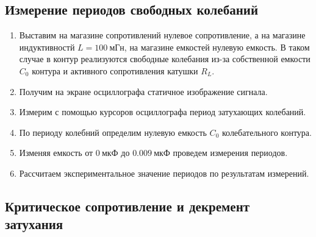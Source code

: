 \documentclass[14pt, a4paper]{report}
\begin{document}
\subsection{Измерение периодов свободных колебаний}

\begin{enumerate}

\setcounter{enumi}{0}

\item Выставим на магазине сопротивлений нулевое сопротивление, а на магазине индуктивностй $L=100\ мГн$, на магазине емкостей нулевую емкость. В таком случае в контур реализуются свободные колебания из-за собственной емкости $C_0$ контура и активного сопротивления катушки $R_L$.

\item Получим на экране осциллографа статичное изображение сигнала.

\item Измерим с помощью курсоров осциллографа период затухающих колебаний.

\item По периоду колебний определим нулевую емкость $C_0$ колебательного контура.

\item Изменяя емкость от $0\ мкФ$ до $0.009\  мкФ$ проведем измерения периодов.

\item Рассчитаем экспериментальное значение периодов по результатам измерений.

\end{enumerate}

\subsection{Критическое сопротивление и декремент затухания}
\end{document}
